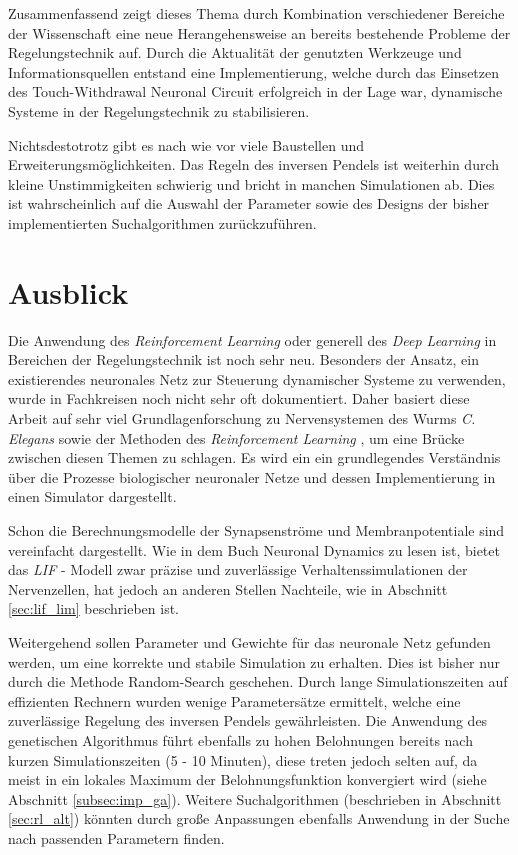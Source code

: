 	Zusammenfassend zeigt dieses Thema durch Kombination verschiedener Bereiche der Wissenschaft eine neue Herangehensweise an bereits bestehende Probleme der Regelungstechnik auf. Durch die Aktualität der genutzten Werkzeuge und Informationsquellen entstand eine Implementierung, welche durch das Einsetzen des Touch-Withdrawal Neuronal Circuit \cite{WormLevelRL} erfolgreich in der Lage war, dynamische Systeme in der Regelungstechnik zu stabilisieren.
	
	Nichtsdestotrotz gibt es nach wie vor viele Baustellen und Erweiterungsmöglichkeiten. Das Regeln des inversen Pendels ist weiterhin durch kleine Unstimmigkeiten schwierig und bricht in manchen Simulationen ab. Dies ist wahrscheinlich auf die Auswahl der Parameter sowie des Designs der bisher implementierten Suchalgorithmen zurückzuführen.

\section{Ausblick}
\label{sec:erg_ausblick}
	Die Anwendung des \textit{Reinforcement Learning} oder generell des \textit{Deep Learning} in Bereichen der Regelungstechnik ist noch sehr neu. Besonders der Ansatz, ein existierendes neuronales Netz zur Steuerung dynamischer Systeme zu verwenden, wurde in Fachkreisen noch nicht sehr oft dokumentiert. Daher basiert diese Arbeit auf sehr viel Grundlagenforschung zu Nervensystemen des Wurms \textit{C. Elegans} \cite{CElegans} sowie der Methoden des \textit{Reinforcement Learning} \cite{DeepLearning} \cite{Russell2016}, um eine Brücke zwischen diesen Themen zu schlagen. Es wird ein ein grundlegendes Verständnis über die Prozesse biologischer neuronaler Netze und dessen Implementierung in einen Simulator dargestellt.
	
	Schon die Berechnungsmodelle der Synapsenströme und Membranpotentiale sind vereinfacht dargestellt. Wie in dem Buch Neuronal Dynamics \cite{NeuronalDynamics} zu lesen ist, bietet das \textit{LIF} - Modell zwar präzise und zuverlässige Verhaltenssimulationen der Nervenzellen, hat jedoch an anderen Stellen Nachteile, wie in Abschnitt \ref{sec:lif_lim} beschrieben ist.
	
	Weitergehend sollen Parameter und Gewichte für das neuronale Netz gefunden werden, um eine korrekte und stabile Simulation zu erhalten. Dies ist bisher nur durch die Methode Random-Search geschehen. Durch lange Simulationszeiten auf effizienten Rechnern wurden wenige Parametersätze ermittelt, welche eine zuverlässige Regelung des inversen Pendels gewährleisten. Die Anwendung des genetischen Algorithmus führt ebenfalls zu hohen Belohnungen bereits nach kurzen Simulationszeiten (5 - 10 Minuten), diese treten jedoch selten auf, da meist in ein lokales Maximum der Belohnungsfunktion konvergiert wird (siehe Abschnitt \ref{subsec:imp_ga}). Weitere Suchalgorithmen (beschrieben in Abschnitt \ref{sec:rl_alt}) könnten durch große Anpassungen ebenfalls Anwendung in der Suche nach passenden Parametern finden.
	
